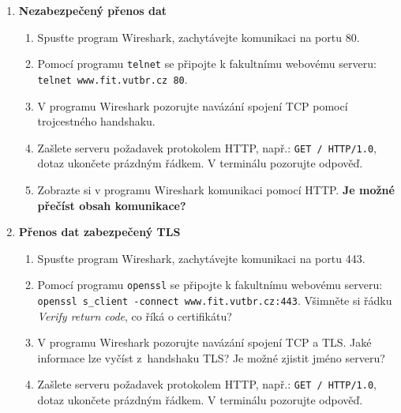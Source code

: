 \documentclass[a4paper,11pt]{article}
\begin{document}
\begin{enumerate}

  \item {\bf  Nezabezpečený přenos dat}

    \begin{enumerate}

      \item Spusťte program Wireshark, zachytávejte komunikaci na portu 80.

      \item Pomocí programu {\tt telnet} se připojte k fakultnímu webovému
        serveru: \\ \verb|telnet www.fit.vutbr.cz 80|.

      \item V programu Wireshark pozorujte navázání spojení TCP pomocí
        trojcestného handshaku.

      \item Zašlete serveru požadavek protokolem HTTP, např.:
        \verb|GET / HTTP/1.0|, dotaz ukončete prázdným řádkem. V terminálu pozorujte
        odpověď.

      \item Zobrazte si v programu Wireshark komunikaci pomocí HTTP. {\bf Je možné
        přečíst obsah komunikace?}

    \end{enumerate}

  \item {\bf Přenos dat zabezpečený TLS}

    \begin{enumerate}

      \item Spusťte program Wireshark, zachytávejte komunikaci na portu 443.

      \item Pomocí programu {\tt openssl} se připojte k fakultnímu webovému
        serveru: \\ \verb|openssl s_client -connect www.fit.vutbr.cz:443|.
        Všimněte si řádku \emph{Verify return code}, co
        říká o certifikátu?

      \item V programu Wireshark pozorujte navázání spojení TCP a TLS. Jaké
        informace lze vyčíst z~handshaku TLS? Je možné zjistit jméno serveru?

      \item Zašlete serveru požadavek protokolem HTTP, např.:
        \verb|GET / HTTP/1.0|, dotaz ukončete prázdným řádkem. V terminálu pozorujte
        odpověď.


\end{enumerate}
\end{enumerate}
\end{document}
